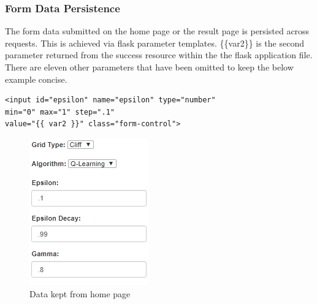 \subsubsection{Form Data Persistence}
The form data submitted on the home page or the result page is persisted across requests. This is achieved via flask parameter templates. \{\{var2\}\} is the second parameter returned from the success resource within the the flask application file. There are eleven other parameters that have been omitted to keep the below example concise.
\begin{verbatim}
<input id="epsilon" name="epsilon" type="number" 
min="0" max="1" step=".1" 
value="{{ var2 }}" class="form-control">
\end{verbatim}
\begin{figure}[H]
	\centering
	\includegraphics[width=0.7\linewidth]{img/result}
	\caption{Data kept from home page}
	\label{fig:result}
\end{figure}

